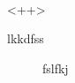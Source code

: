 \usepackage{palatino}



\textsf{}

\begin{eqnarray}
  
  \label{<++>}
\end{eqnarray}<++>

\begin{center}
  
\end{center}



\begin{item}    
\item
\item
  \begin{description}
    \item[lkkdfss]fslfkj

  \end{description}
\end{item}

